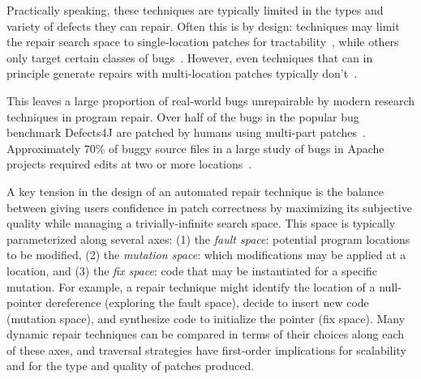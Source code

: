 \documentclass[sigconf, timestamp-false, anonymous=true]{acmart}
\begin{document}
Practically speaking, these techniques are typically limited in the types and
variety of defects they can repair. Often this is by design: techniques may
limit the repair search space to single-location patches for
tractability~\cite{rsrepair,ae,hdrepair}, while others only target certain
classes of bugs~\cite{Xuan17,sapfix,DeMarco14,par}. However, even techniques
that can in principle generate repairs with multi-location patches typically
don't~\cite{genprog,others}.

This leaves a large proportion of real-world bugs unrepairable by modern
research techniques in program repair.  Over half of the bugs in the popular bug
benchmark Defects4J are patched by humans using multi-part
patches~\cite{d4j-dissection}. Approximately 70\% of buggy source files in a
large study of bugs in Apache projects required edits at two or more
locations~\cite{zhong2015}.

A key tension in the design of an automated repair technique is the balance
between giving users confidence in patch correctness by maximizing its
subjective quality while managing a trivially-infinite search space. This space
is typically parameterized along several axes: (1) the \emph{fault space}:
potential program locations to be modified, (2) the \emph{mutation space}: which
modifications may be applied at a location, and (3) the \emph{fix space}: code
that may be instantiated for a specific mutation. For example, a repair
technique might identify the location of a null-pointer dereference (exploring
the fault space), decide to insert new code (mutation space), and synthesize
code to initialize the pointer (fix space). Many dynamic repair techniques can
be compared in terms of their choices along each of these axes, and traversal
strategies have first-order implications for scalability and for the type and
quality of patches produced.
\end{document}
